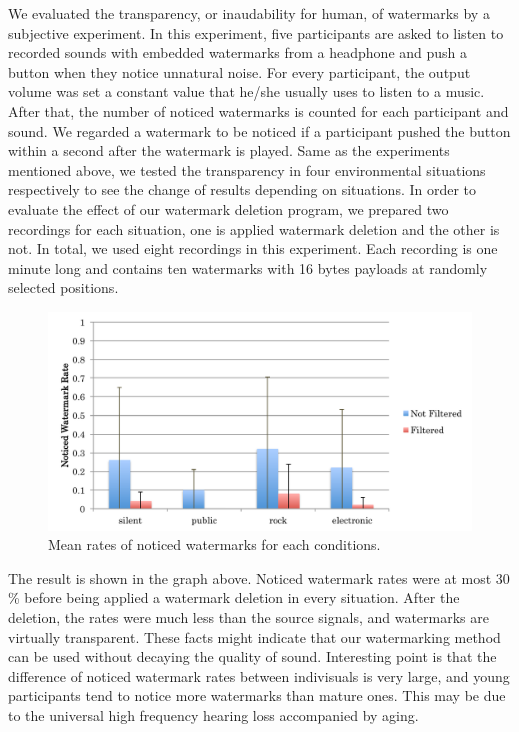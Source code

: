 We evaluated the transparency, or inaudability for human, of watermarks by a subjective experiment.
In this experiment, five participants are asked to listen to recorded sounds with embedded watermarks from a headphone and push a button when they notice unnatural noise.
For every participant, the output volume was set a constant value that he/she usually uses to listen to a music.
After that, the number of noticed watermarks is counted for each participant and sound.
We regarded a watermark to be noticed if a participant pushed the button within a second after the watermark is played.
Same as the experiments mentioned above, we tested the transparency in four environmental situations respectively to see the change of results depending on situations.
In order to evaluate the effect of our watermark deletion program, we prepared two recordings for each situation, one is applied watermark deletion and the other is not.
In total, we used eight recordings in this experiment.
Each recording is one minute long and contains ten watermarks with 16 bytes payloads at randomly selected positions.

\begin{figure}[htbp]
 \begin{center}
  \includegraphics[width=120mm]{evaluation_transparency.pdf}
 \end{center}
 \caption{Mean rates of noticed watermarks for each conditions.}
 \label{fig:eval_tran}
\end{figure}

The result is shown in the graph above.
Noticed watermark rates were at most 30 \% before being applied a watermark deletion in every situation.
After the deletion, the rates were much less than the source signals, and watermarks are virtually transparent.
These facts might indicate that our watermarking method can be used without decaying the quality of sound.
Interesting point is that the difference of noticed watermark rates between indivisuals is very large, and young participants tend to notice more watermarks than mature ones.
This may be due to the universal high frequency hearing loss accompanied by aging.
